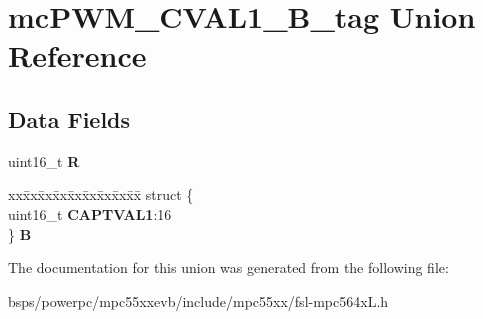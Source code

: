 \hypertarget{unionmcPWM__CVAL1__16B__tag}{}\section{mc\+P\+W\+M\+\_\+\+C\+V\+A\+L1\+\_\+B\+\_\+tag Union Reference}
\label{unionmcPWM__CVAL1__16B__tag}
\subsection*{Data Fields}
\begin{DoxyCompactItemize}
\item 
\mbox{\label{unionmcPWM__CVAL1__16B__tag_a82f865598f1cbfb6425187db8c603529}} 
uint16\+\_\+t {\bfseries R}
\item 
\mbox{\label{unionmcPWM__CVAL1__16B__tag_a581c3458369803b36aff7812ab1a70fe}} 
\begin{tabbing}
xx\=xx\=xx\=xx\=xx\=xx\=xx\=xx\=xx\=\kill
struct \{\\
\>uint16\_t {\bfseries CAPTVAL1}:16\\
\} {\bfseries B}\\

\end{tabbing}\end{DoxyCompactItemize}


The documentation for this union was generated from the following file\+:\begin{DoxyCompactItemize}
\item 
bsps/powerpc/mpc55xxevb/include/mpc55xx/fsl-\/mpc564x\+L.\+h\end{DoxyCompactItemize}
